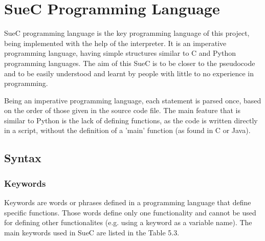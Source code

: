 \documentclass[12pt,a4paper,twoside]{report}
\begin{document}
\section{SueC Programming Language}

SueC programming language is the key programming language of this project, being implemented with the help of the interpreter. It is an imperative programming language, having simple structures similar to C and Python programming languages. The aim of this SueC is to be closer to the pseudocode and to be easily understood and learnt by people with little to no experience in programming.

Being an imperative programming language, each statement is parsed once, based on the order of those given in the source code file. The main feature that is similar to Python is the lack of defining functions, as the code is written directly in a script, without the definition of a 'main' function (as found in C or Java). 

\subsection{Syntax}

\subsubsection{Keywords}

	Keywords are words or phrases defined in a programming language that define specific functions. Those words define only one functionality and cannot be used for defining other functionalites (e.g. using a keyword as a variable name). The main keywords used in SueC are listed in the Table 5.3.
	
\end{document}
